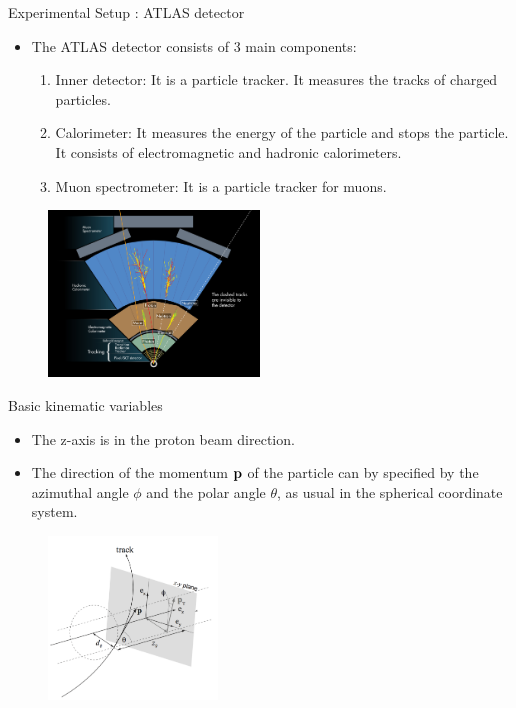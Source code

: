 \documentclass[mathserif,serif]{beamer}
\begin{document}
\begin{frame}{Experimental Setup : ATLAS detector}
\begin{itemize}
\item The ATLAS detector consists of 3 main components:
\begin{enumerate}
\item Inner detector: It is a particle tracker. It measures the tracks of charged particles.
\item Calorimeter: It measures the energy of the particle and stops the particle. It consists of electromagnetic and hadronic calorimeters.
\item Muon spectrometer:  It is a particle tracker for muons.
\end{enumerate}
\end{itemize}
\begin{figure}
\centering
\includegraphics[width=0.5\textwidth]{data/photo/detector/ATLAS_particles.jpg}
\end{figure}
\end{frame}

\begin{frame}{Basic kinematic variables}
\begin{itemize}
\item The z-axis is in the proton beam direction.
\item The direction of the momentum $\bf{p}$ of the particle can by specified by the azimuthal angle $\phi$ and the polar angle $\theta$, as usual in the spherical coordinate system.
\end{itemize}
\begin{figure}
\centering
\includegraphics[width=0.4\textwidth]{data/photo/detector/impact_parameter.png}
\end{figure}
\end{frame}
\end{document}
